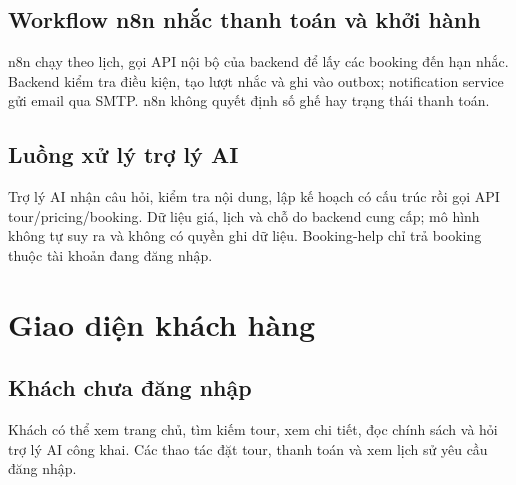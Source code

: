 \subsection{Workflow n8n nhắc thanh toán và khởi hành}

n8n chạy theo lịch, gọi API nội bộ của backend để lấy các booking đến hạn nhắc. Backend kiểm tra điều kiện, tạo lượt nhắc và ghi vào outbox; notification service gửi email qua SMTP. n8n không quyết định số ghế hay trạng thái thanh toán.


\subsection{Luồng xử lý trợ lý AI}

Trợ lý AI nhận câu hỏi, kiểm tra nội dung, lập kế hoạch có cấu trúc rồi gọi API tour/\hspace{0pt}pricing/\hspace{0pt}booking. Dữ liệu giá, lịch và chỗ do backend cung cấp; mô hình không tự suy ra và không có quyền ghi dữ liệu. Booking-help chỉ trả booking thuộc tài khoản đang đăng nhập.


\section{Giao diện khách hàng}
\label{sec:giao-dien-khach-hang}

\subsection{Khách chưa đăng nhập}

Khách có thể xem trang chủ, tìm kiếm tour, xem chi tiết, đọc chính sách và hỏi trợ lý AI công khai. Các thao tác đặt tour, thanh toán và xem lịch sử yêu cầu đăng nhập.





